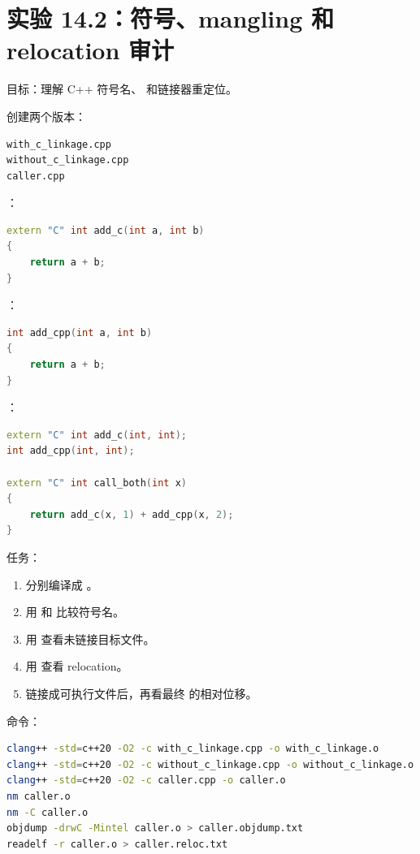 \section{实验 14.2：符号、mangling 和 relocation 审计}

\begin{labbox}
目标：理解 C++ 符号名、 和链接器重定位。

创建两个版本：

\begin{lstlisting}
with_c_linkage.cpp
without_c_linkage.cpp
caller.cpp
\end{lstlisting}

：

\begin{lstlisting}[language=C++]
extern "C" int add_c(int a, int b)
{
    return a + b;
}
\end{lstlisting}

：

\begin{lstlisting}[language=C++]
int add_cpp(int a, int b)
{
    return a + b;
}
\end{lstlisting}

：

\begin{lstlisting}[language=C++]
extern "C" int add_c(int, int);
int add_cpp(int, int);

extern "C" int call_both(int x)
{
    return add_c(x, 1) + add_cpp(x, 2);
}
\end{lstlisting}

任务：

\begin{enumerate}
  \item 分别编译成 。
  \item 用  和  比较符号名。
  \item 用  查看未链接目标文件。
  \item 用  查看 relocation。
  \item 链接成可执行文件后，再看最终  的相对位移。
\end{enumerate}

命令：

\begin{lstlisting}[language=bash]
clang++ -std=c++20 -O2 -c with_c_linkage.cpp -o with_c_linkage.o
clang++ -std=c++20 -O2 -c without_c_linkage.cpp -o without_c_linkage.o
clang++ -std=c++20 -O2 -c caller.cpp -o caller.o
nm caller.o
nm -C caller.o
objdump -drwC -Mintel caller.o > caller.objdump.txt
readelf -r caller.o > caller.reloc.txt
\end{lstlisting}


\end{labbox}
